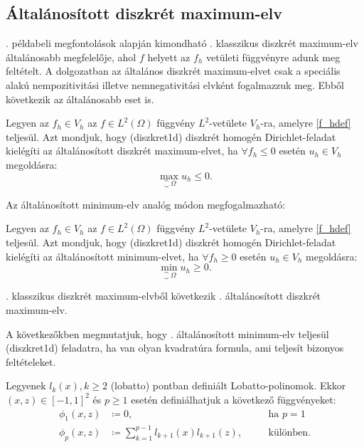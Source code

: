 \subsection{Általánosított diszkrét maximum-elv}

. példabeli megfontolások alapján kimondható . klasszikus diszkrét maximum-elv általánosabb megfelelője, ahol  $f$ helyett az $f_h$ vetületi függvényre adunk meg feltételt. A dolgozatban az általános diszkrét maximum-elvet csak a speciális alakú nempozitivitási illetve nemnegativitási elvként fogalmazzuk meg. Ebből következik az általánosabb eset is.


\begin{definition}\label{gDMP}
	Legyen az $f_h \in V_h$ az $f \in L^2(\Omega)$ függvény $L^2$-vetülete $V_h$-ra, amelyre \eqref{f_hdef} teljesül. Azt mondjuk, hogy \aref({diszkret1d}) diszkrét homogén Dirichlet-feladat kielégíti az általánosított diszkrét maximum-elvet, ha $\forall f_h \leq 0$ esetén $u_h \in V_h$ megoldásra:
	\begin{equation}\label{eq:gDMP}
		\max_{\closure{\Omega}} u_h \leq 0.
	\end{equation}	
\end{definition}

Az általánosított minimum-elv analóg módon megfogalmazható:

\begin{definition}\label{gDMinP}
	Legyen az $f_h \in V_h$ az $f \in L^2(\Omega)$ függvény $L^2$-vetülete $V_h$-ra, amelyre \eqref{f_hdef} teljesül. Azt mondjuk, hogy \aref({diszkret1d}) diszkrét homogén Dirichlet-feladat kielégíti az általánosított minimum-elvet, ha $\forall f_h \geq 0$ esetén $u_h \in V_h$ megoldásra:
	\begin{equation}\label{eq:gDMP}
		\min_{\closure{\Omega}} u_h \geq 0.
	\end{equation}	
\end{definition}


\begin{remark}
	. klasszikus diszkrét maximum-elvből következik . általánosított diszkrét maximum-elv.
\end{remark}


A következőkben megmutatjuk, hogy . általánosított minimum-elv teljesül \aref({diszkret1d}) feladatra, ha van olyan kvadratúra formula, ami teljesít bizonyos feltételeket. 

\begin{definition}
	Legyenek $l_k(x), k\geq 2$ \aref({lobatto}) pontban definiált Lobatto-polinomok. Ekkor $(x,z) \in [-1,1]^2$ és $p\geq 1$ esetén definiálhatjuk a következő függvényeket:
	\begin{equation}\label{phipdef}
		\begin{aligned}
			\phi_1(x,z) &\coloneqq 0,& &\quad \text{ha } p = 1 \\
			\phi_p(x,z) &\coloneqq \sum_{k=1}^{p-1} l_{k+1}(x)l_{k+1}(z),& &\quad \text{különben}.
		\end{aligned}
	\end{equation}
\end{definition}


